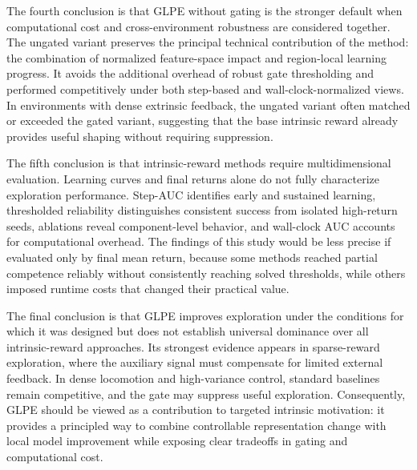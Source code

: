 The fourth conclusion is that GLPE without gating is the stronger default when computational cost and cross-environment robustness are considered together.
The ungated variant preserves the principal technical contribution of the method: the combination of normalized feature-space impact and region-local learning progress.
It avoids the additional overhead of robust gate thresholding and performed competitively under both step-based and wall-clock-normalized views.
In environments with dense extrinsic feedback, the ungated variant often matched or exceeded the gated variant, suggesting that the base intrinsic reward already provides useful shaping without requiring suppression.

The fifth conclusion is that intrinsic-reward methods require multidimensional evaluation.
Learning curves and final returns alone do not fully characterize exploration performance.
Step-AUC identifies early and sustained learning, thresholded reliability distinguishes consistent success from isolated high-return seeds, ablations reveal component-level behavior, and wall-clock AUC accounts for computational overhead.
The findings of this study would be less precise if evaluated only by final mean return, because some methods reached partial competence reliably without consistently reaching solved thresholds, while others imposed runtime costs that changed their practical value.

The final conclusion is that GLPE improves exploration under the conditions for which it was designed but does not establish universal dominance over all intrinsic-reward approaches.
Its strongest evidence appears in sparse-reward exploration, where the auxiliary signal must compensate for limited external feedback.
In dense locomotion and high-variance control, standard baselines remain competitive, and the gate may suppress useful exploration.
Consequently, GLPE should be viewed as a contribution to targeted intrinsic motivation: it provides a principled way to combine controllable representation change with local model improvement while exposing clear tradeoffs in gating and computational cost.